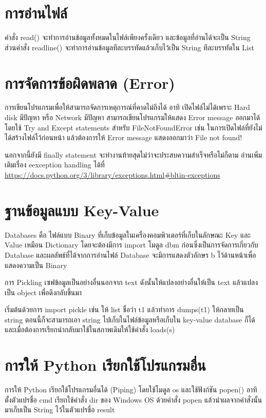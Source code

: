 \section{การอ่านไฟล์}

คำสั่ง read() จะทำการอ่านข้อมูลทั้งหมดในไฟล์เพียงครั้งเดียว และข้อมูลที่อ่านได้จะเป็น String ส่วนคำสั่ง readline() จะทำการอ่านข้อมูลทีละบรรทัดแล้วเก็บไว้เป็น String ทีละบรรทัดใน List

\section{การจัดการข้อผิดพลาด (Error)}

การเขียนโปรแกรมเพื่อให้สามารถจัดการเหตุการณ์ที่คาดไม่ถึงได้ อาทิ เปิดไฟล์ไม่ได้เพราะ Hard disk มีปัญหา หรือ Network มีปัญหา สามารถเขียนโปรแกรมให้แสดง Error message ออกมาได้ โดยใช้ Try and Except statements สำหรับ FileNotFoundError เช่น ในการเปิดไฟล์ที่ยังไม่ได้สร้างไฟล์ไว้ก่อนหน้า แล้วต้องการให้ Error message แสดงออกมาว่า  File not found!

นอกจากนี้ยังมี finally statement จะทำงานท้ายสุดไม่ว่าจะประสบความสำเร็จหรือไม่ก็ตาม อ่านเพิ่มเติมเรื่อง eexception handling ได้ที่ \url{https://docs.python.org/3/library/exceptions.html#bltin-exceptions}

\section{ฐานข้อมูลแบบ Key-Value}

Databases คือ ไฟล์แบบ Binary ที่เก็บข้อมูลในเครื่องคอมพิวเตอร์ที่เก็บในลักษณะ Key และ Value เหมือน Dictionary โดยจะต้องมีการ import โมดูล dbm ก่อนซึ่งเป็นการจัดการเกี่ยวกับ Database และผลลัพธ์ที่ได้จากการอ่านไฟล์ Database จะมีการแสดงตัวอักษร b ไว้ด้านหน้าเพื่อแสดงความเป็น Binary

การ Pickling เซฟข้อมูลเป็นอย่างอื่นนอกจาก text ดังนั้นให้แปลงอย่างอื่นให้เป็น text แล้วแปลงเป็น object เพื่อดึงกลับขึ้นมา

เริ่มต้นด้วยการ import pickle เช่น ให้ list ชื่อว่า t1 แล้วทำการ dumps(t1) ให้กลายเป็น string ตอนนี้ก็จะสามารถเอา string ไปเก็บในไฟล์ข้อมูลหรือเก็บใน key-value database ก็ได้ และเมื่อต้องการเรียกนำกลับมาใช้ในสภาพเดิมให้ใช้คำสั่ง loads(s) 

\section{การให้ Python เรียกใช้โปรแกรมอื่น}

การให้ Python เรียกใช้โปรแกรมอื่นได้ (Piping) โดยใช้โมดูล os และใช้ฟังก์ชัน popen()  อาทิ ตั้งตัวแปรชื่อ cmd เรียกใช้คำสั่ง dir ของ Windows OS ด้วยคำสั่ง popen แล้วนำผลจากคำสั่งนั้นมาเก็บเป็น String ไว้ในตัวแปรชื่อ result 

